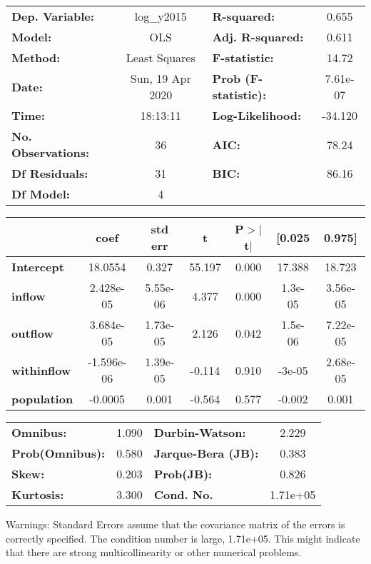 \begin{center}
\begin{tabular}{lclc}
\toprule
\textbf{Dep. Variable:}    &    log\_y2015    & \textbf{  R-squared:         } &     0.655   \\
\textbf{Model:}            &       OLS        & \textbf{  Adj. R-squared:    } &     0.611   \\
\textbf{Method:}           &  Least Squares   & \textbf{  F-statistic:       } &     14.72   \\
\textbf{Date:}             & Sun, 19 Apr 2020 & \textbf{  Prob (F-statistic):} &  7.61e-07   \\
\textbf{Time:}             &     18:13:11     & \textbf{  Log-Likelihood:    } &   -34.120   \\
\textbf{No. Observations:} &          36      & \textbf{  AIC:               } &     78.24   \\
\textbf{Df Residuals:}     &          31      & \textbf{  BIC:               } &     86.16   \\
\textbf{Df Model:}         &           4      & \textbf{                     } &             \\
\bottomrule
\end{tabular}
\begin{tabular}{lcccccc}
                    & \textbf{coef} & \textbf{std err} & \textbf{t} & \textbf{P$> |$t$|$} & \textbf{[0.025} & \textbf{0.975]}  \\
\midrule
\textbf{Intercept}  &      18.0554  &        0.327     &    55.197  &         0.000        &       17.388    &       18.723     \\
\textbf{inflow}     &    2.428e-05  &     5.55e-06     &     4.377  &         0.000        &      1.3e-05    &     3.56e-05     \\
\textbf{outflow}    &    3.684e-05  &     1.73e-05     &     2.126  &         0.042        &      1.5e-06    &     7.22e-05     \\
\textbf{withinflow} &   -1.596e-06  &     1.39e-05     &    -0.114  &         0.910        &       -3e-05    &     2.68e-05     \\
\textbf{population} &      -0.0005  &        0.001     &    -0.564  &         0.577        &       -0.002    &        0.001     \\
\bottomrule
\end{tabular}
\begin{tabular}{lclc}
\textbf{Omnibus:}       &  1.090 & \textbf{  Durbin-Watson:     } &    2.229  \\
\textbf{Prob(Omnibus):} &  0.580 & \textbf{  Jarque-Bera (JB):  } &    0.383  \\
\textbf{Skew:}          &  0.203 & \textbf{  Prob(JB):          } &    0.826  \\
\textbf{Kurtosis:}      &  3.300 & \textbf{  Cond. No.          } & 1.71e+05  \\
\bottomrule
\end{tabular}
\end{center}

Warnings: \newline
 [1] Standard Errors assume that the covariance matrix of the errors is correctly specified. \newline
 [2] The condition number is large, 1.71e+05. This might indicate that there are \newline
 strong multicollinearity or other numerical problems.